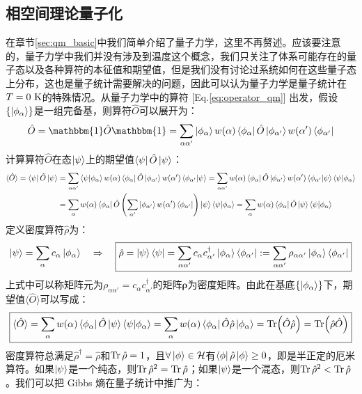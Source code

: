 \subsection{相空间理论量子化}
在章节\ref{sec:qm_basic}中我们简单介绍了量子力学，这里不再赘述。应该要注意的，量子力学中我们并没有涉及到温度这个概念，我们只关注了体系可能存在的量子态以及各种算符的本征值和期望值，但是我们没有讨论过系统如何在这些量子态上分布，这也是量子统计需要解决的问题，因此可以认为量子力学是量子统计在$T=0 \ \rm{K}$的特殊情况。从量子力学中的算符 [Eq.\eqref{eq:operator_qm}] 出发，假设$\{\ket{\phi_{\alpha}}\}$是一组完备基，则算符$\hat{O}$可以展开为：
\[\hat{O}=\mathbbm{1}\hat{O}\mathbbm{1}=\sum_{\alpha\alpha'}\ket{\phi_{\alpha}}w(\alpha)\bra{\phi_{\alpha}}\hat{O}\ket{\phi_{\alpha'}}w(\alpha')\bra{\phi_{\alpha'}}\]
计算算符$\hat{O}$在态$\ket{\psi}$上的期望值$\bra{\psi}\hat{O}\ket{\psi}$：
\[\begin{aligned}
\langle\hat{O}\rangle=\bra{\psi}\hat{O}\ket{\psi}&=\sum_{\alpha\alpha'}\bra{\psi}\ket{\phi_{\alpha}}w(\alpha)\bra{\phi_{\alpha}}\hat{O}\ket{\phi_{\alpha'}}w(\alpha')\bra{\phi_{\alpha'}}\ket{\psi}=\sum_{\alpha\alpha'}w(\alpha)\bra{\phi_{\alpha}}\hat{O}\ket{\phi_{\alpha'}}w(\alpha')\bra{\phi_{\alpha'}}\ket{\psi}\bra{\psi}\ket{\phi_{\alpha}}\\
&=\sum_{\alpha}w(\alpha)\bra{\phi_{\alpha}}\hat{O}\left(\sum_{\alpha'}\ket{\phi_{\alpha'}}w(\alpha')\bra{\phi_{\alpha'}}\right)\ket{\psi}\bra{\psi}\ket{\phi_{\alpha}}=\sum_{\alpha}w(\alpha)\bra{\phi_{\alpha}}\hat{O}\ket{\psi}\bra{\psi}\ket{\phi_{\alpha}}\\
\end{aligned}\]
定义密度算符$\hat{\rho}$为：
\[\ket{\psi}=\sum_{\alpha}c_{\alpha}\ket{\phi_{\alpha}} \quad \Rightarrow \quad \boxed{\hat{\rho}=\ket{\psi}\bra{\psi}=\sum_{\alpha\alpha'}c_{\alpha}c^{\dagger}_{\alpha'}\ket{\phi_{\alpha}}\bra{\phi_{\alpha'}}:=\sum_{\alpha\alpha'}\rho_{\alpha\alpha'}\ket{\phi_{\alpha}}\bra{\phi_{\alpha'}}}\]
上式中可以称矩阵元为$\rho_{\alpha\alpha'}=c_{\alpha}c^{\dagger}_{\alpha'}$的矩阵$\bm{\rho}$为密度矩阵。由此在基底$\{\ket{\phi_{\alpha}}\}$下，期望值$\langle\hat{O}\rangle$可以写成：
\[\boxed{\langle\hat{O}\rangle=\sum_{\alpha}w(\alpha)\bra{\phi_{\alpha}}\hat{O}\ket{\psi}\bra{\psi}\ket{\phi_{\alpha}}=\sum_{\alpha}w(\alpha)\bra{\phi_{\alpha}}\hat{O}\hat{\rho}\ket{\phi_{\alpha}}=\Tr(\hat{O}\hat{\rho})=\Tr(\hat{\rho}\hat{O})}\]
密度算符总满足$\hat{\rho}^{\dagger}=\hat{\rho}$和$\Tr\hat{\rho}=1$，且$\forall \ket{\phi}\in\mathcal{H}$有$\bra{\phi}\hat{\rho}\ket{\phi}\ge 0$，即是半正定的厄米算符。如果$\ket{\psi}$是一个纯态，则$\Tr\hat{\rho}^2=\Tr\hat{\rho}$；如果$\ket{\psi}$是一个混态，则$\Tr\hat{\rho}^2<\Tr\hat{\rho}$。我们可以把 Gibbs 熵在量子统计中推广为：
